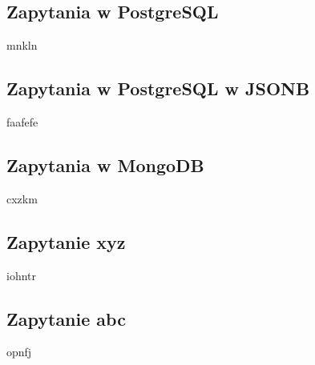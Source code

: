 \documentclass[11pt]{article}
\begin{document}
	\subsection{Zapytania w PostgreSQL}
		mnkln
	\subsection{Zapytania w PostgreSQL w JSONB}
		faafefe
	\subsection{Zapytania w MongoDB}
		cxzkm
	\subsection{Zapytanie xyz}
		iohntr
	\subsection{Zapytanie abc}
		opnfj
\end{document}

